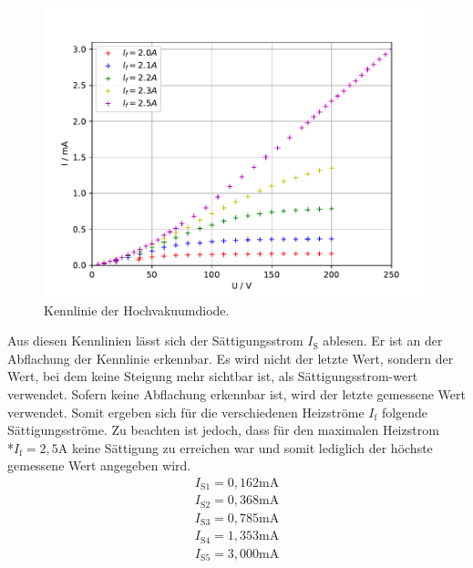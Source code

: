 \begin{figure}[H]
    \centering
    \includegraphics[scale=0.7]{Auswertung/Kennlinien.pdf}
    \caption{Kennlinie der Hochvakuumdiode.}
    \label{fig:Kennlinie}
\end{figure}

Aus diesen Kennlinien lässt sich der Sättigungsstrom $I_\text{S}$ ablesen. Er ist an der Abflachung der Kennlinie erkennbar. Es wird nicht der letzte Wert, sondern der Wert, bei dem keine Steigung mehr sichtbar ist, als Sättigungsstrom-wert verwendet. Sofern keine Abflachung erkennbar ist, wird der letzte gemessene Wert verwendet. Somit ergeben sich für die verschiedenen Heizströme $I_\text{f}$ folgende Sättigungsströme. Zu beachten ist jedoch, dass für den maximalen Heizstrom \\*$I_\text{f} = 2,5 \text{A}$ keine Sättigung zu erreichen war und somit lediglich der höchste gemessene Wert angegeben wird.
\begin{gather*}
	I_\text{S1} = 0,162 \text{mA} \\
	I_\text{S2} = 0,368 \text{mA} \\
	I_\text{S3} = 0,785 \text{mA} \\
	I_\text{S4} = 1,353 \text{mA} \\
	I_\text{S5} = 3,000 \text{mA}
\end{gather*}

